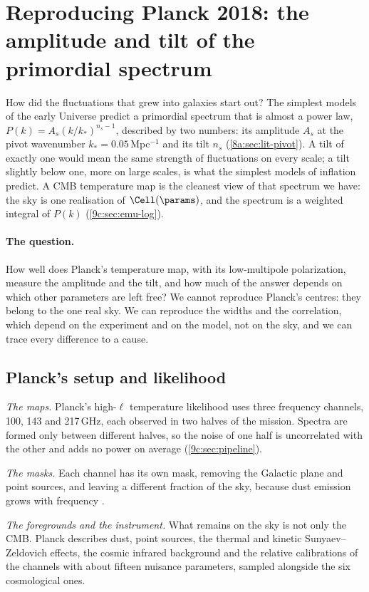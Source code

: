 \section{Reproducing Planck 2018: the amplitude and tilt of the primordial spectrum}
\label{9c:sec:planck}

How did the fluctuations that grew into galaxies start out? The simplest models of the early Universe predict a
primordial spectrum that is almost a power law, $P(k)=A_s(k/k_*)^{n_s-1}$, described by two numbers: its amplitude
$A_s$ at the pivot wavenumber $k_*=0.05$\,Mpc$^{-1}$ and its tilt $n_s$ (\cref{8a:sec:lit-pivot}). A tilt of exactly one
would mean the same strength of fluctuations on every scale; a tilt slightly below one, more on large scales, is
what the simplest models of inflation predict. A CMB temperature map is the cleanest view of that spectrum we
have: the sky is one realisation of $\Cell(\params)$, and the spectrum is a weighted integral of $P(k)$
(\cref{9c:sec:emu-log}).

\paragraph{The question.} How well does Planck's temperature map, with its low-multipole polarization, measure the
amplitude and the tilt, and how much of the answer depends on which other parameters are left free? We cannot
reproduce Planck's centres: they belong to the one real sky. We can reproduce the widths and the correlation,
which depend on the experiment and on the model, not on the sky, and we can trace every difference to a cause.

\subsection{Planck's setup and likelihood}
\label{9c:sec:planck-their}

\emph{The maps.} Planck's high-$\ell$ temperature likelihood uses three frequency channels, 100, 143 and 217\,GHz,
each observed in two halves of the mission. Spectra are formed only between different halves, so the noise of one
half is uncorrelated with the other and adds no power on average (\cref{9c:sec:pipeline}).

\emph{The masks.} Each channel has its own mask, removing the Galactic plane and point sources, and leaving a
different fraction of the sky, because dust emission grows with frequency \cite{Planck2018V}.

\emph{The foregrounds and the instrument.} What remains on the sky is not only the CMB. Planck describes dust,
point sources, the thermal and kinetic Sunyaev--Zeldovich effects, the cosmic infrared background and the relative
calibrations of the channels with about fifteen nuisance parameters, sampled alongside the six cosmological ones.

